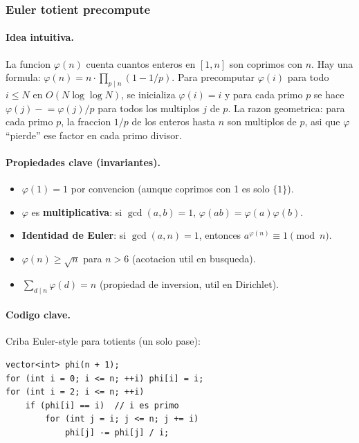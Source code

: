 ﻿\subsubsection{Euler totient precompute}

\paragraph{Idea intuitiva.}
La funcion $\varphi(n)$ cuenta cuantos enteros en $[1, n]$ son coprimos con $n$. Hay una formula: $\varphi(n) = n \cdot \prod_{p \mid n} (1 - 1/p)$. Para precomputar $\varphi(i)$ para todo $i \le N$ en $O(N \log \log N)$, se inicializa $\varphi(i) = i$ y para cada primo $p$ se hace $\varphi(j) \mathrel{-}= \varphi(j)/p$ para todos los multiplos $j$ de $p$. La razon geometrica: para cada primo $p$, la fraccion $1/p$ de los enteros hasta $n$ son multiplos de $p$, asi que $\varphi$ ``pierde'' ese factor en cada primo divisor.

\paragraph{Propiedades clave (invariantes).}
\begin{itemize}\setlength\itemsep{0pt}
	\item $\varphi(1) = 1$ por convencion (aunque coprimos con 1 es solo $\{1\}$).
	\item $\varphi$ es \textbf{multiplicativa}: si $\gcd(a, b) = 1$, $\varphi(ab) = \varphi(a) \varphi(b)$.
	\item \textbf{Identidad de Euler}: si $\gcd(a, n) = 1$, entonces $a^{\varphi(n)} \equiv 1 \pmod n$.
	\item $\varphi(n) \ge \sqrt{n}$ para $n > 6$ (acotacion util en busqueda).
	\item $\sum_{d \mid n} \varphi(d) = n$ (propiedad de inversion, util en Dirichlet).
\end{itemize}

\paragraph{Codigo clave.}
Criba Euler-style para totients (un solo pase):
\begin{verbatim}
vector<int> phi(n + 1);
for (int i = 0; i <= n; ++i) phi[i] = i;
for (int i = 2; i <= n; ++i)
    if (phi[i] == i)  // i es primo
        for (int j = i; j <= n; j += i)
            phi[j] -= phi[j] / i;
\end{verbatim}

